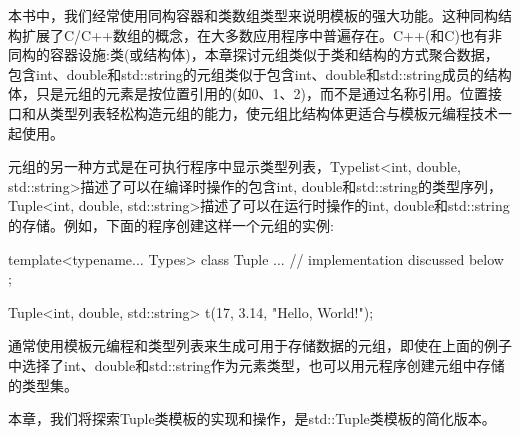 本书中，我们经常使用同构容器和类数组类型来说明模板的强大功能。这种同构结构扩展了C/C++数组的概念，在大多数应用程序中普遍存在。C++(和C)也有非同构的容器设施:类(或结构体)，本章探讨元组类似于类和结构的方式聚合数据，包含int、double和std::string的元组类似于包含int、double和std::string成员的结构体，只是元组的元素是按位置引用的(如0、1、2)，而不是通过名称引用。位置接口和从类型列表轻松构造元组的能力，使元组比结构体更适合与模板元编程技术一起使用。

元组的另一种方式是在可执行程序中显示类型列表，Typelist<int, double, std::string>描述了可以在编译时操作的包含int, double和std::string的类型序列，Tuple<int, double, std::string>描述了可以在运行时操作的int, double和std::string的存储。例如，下面的程序创建这样一个元组的实例:

\begin{cpp}
template<typename... Types>
class Tuple {
	... // implementation discussed below
};

Tuple<int, double, std::string> t(17, 3.14, "Hello, World!");
\end{cpp}

通常使用模板元编程和类型列表来生成可用于存储数据的元组，即使在上面的例子中选择了int、double和std::string作为元素类型，也可以用元程序创建元组中存储的类型集。

本章，我们将探索Tuple类模板的实现和操作，是std::Tuple类模板的简化版本。






























